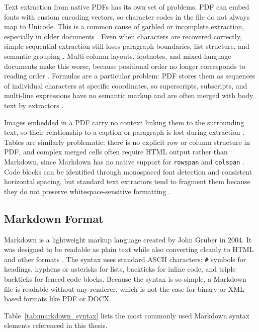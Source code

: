 \documentclass[12pt]{article}
\begin{document}
Text extraction from native PDFs has its own set of problems. PDF can embed
fonts with custom encoding vectors, so character codes in the file do not
always map to Unicode. This is a common cause of garbled or incomplete
extraction, especially in older documents \cite{whitington2012}. Even when
characters are recovered correctly, simple sequential extraction still loses
paragraph boundaries, list structure, and semantic grouping
\cite{meuschke2023}. Multi-column layouts, footnotes, and mixed-language
documents make this worse, because positional order no longer corresponds to
reading order \cite{gao2011}. Formulas are a particular problem: PDF stores
them as sequences of individual characters at specific coordinates, so
superscripts, subscripts, and multi-line expressions have no semantic markup
and are often merged with body text by extractors \cite{blecher2023}.

Images embedded in a PDF carry no context linking them to the surrounding text,
so their relationship to a caption or paragraph is lost during extraction
\cite{gao2011}. Tables are similarly problematic: there is no explicit row
or column structure in PDF, and complex merged cells often require HTML output
rather than Markdown, since Markdown has no native support for \texttt{rowspan}
and \texttt{colspan} \cite{zhu2022}. Code blocks can be identified through
monospaced font detection and consistent horizontal spacing, but standard text
extractors tend to fragment them because they do not preserve
whitespace-sensitive formatting \cite{meuschke2023}.

\subsection{Markdown Format}

Markdown is a lightweight markup language created by John Gruber in 2004. It
was designed to be readable as plain text while also converting cleanly to HTML
and other formats \cite{cone2019}. The syntax uses standard ASCII characters:
\texttt{\#} symbols for headings, hyphens or asterisks for lists, backticks for
inline code, and triple backticks for fenced code blocks. Because the syntax is
so simple, a Markdown file is readable without any renderer, which is not the
case for binary or XML-based formats like PDF or DOCX.

Table~\ref{tab:markdown_syntax} lists the most commonly used Markdown syntax
elements referenced in this thesis.
\end{document}
